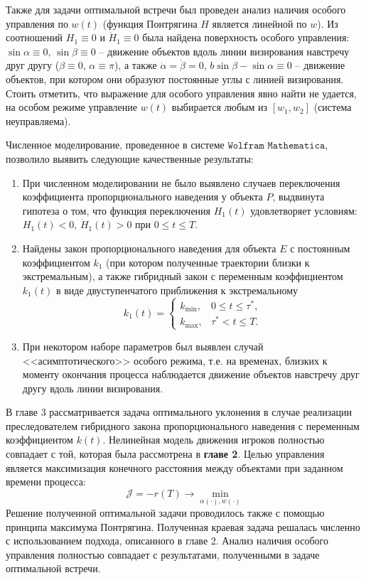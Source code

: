 \documentclass[a4paper,12pt, openany]{book}
\theoremstyle{plain} %
\theoremstyle{definition} %
\theoremstyle{remark} %
\numberwithin{equation}{chapter}
\begin{document}
{Также для задачи оптимальной встречи был проведен анализ наличия особого управления по $w(t)$ (функция Понтрягина $H$ является линейной по $w$). Из соотношений $H_1 \equiv 0$ и $\dot H_1 \equiv 0$ была найдена поверхность особого управления: $\sin\alpha \equiv 0$, $\sin\beta \equiv 0$ -- движение объектов вдоль линии визирования навстречу друг другу ($\beta \equiv 0$, $\alpha \equiv \pi$),  а также $\dot\alpha = \dot\beta = 0$, $b\sin\beta - \sin\alpha \equiv 0$ -- движение объектов, при котором они образуют постоянные углы с линией визирования. Стоить отметить, что выражение для особого управления явно найти не удается, на особом режиме управление $w(t)$ выбирается любым из $[w_1,w_2]$ (система неуправляема).

Численное моделирование, проведенное в системе $\texttt{Wolfram Mathematica}$, позволило выявить следующие качественные результаты:

\begin{enumerate}
\item При численном моделировании не было выявлено случаев переключения коэффициента пропорционального наведения у объекта $P$, выдвинута гипотеза о том, что функция переключения $H_1(t)$ удовлетворяет условиям: $H_1(t) < 0$, $\dot H_1(t) > 0$ при $0\leqslant t \leqslant T$.
\item Найдены закон пропорционального наведения для объекта $E$ с постоянным коэффициентом $k_1$ (при котором полученные траектории близки к экстремальным), а также гибридный закон с переменным коэффициентом $k_1(t)$ в виде двуступенчатого приближения к экстремальному
$$k_1 \left( t \right) = 
\begin{cases}
   k_{\min } , & 0 \leqslant t \leqslant \tau^* ,  \\
   k_{\max } ,& \tau^*  < t \leqslant T. 
\end{cases}
$$ 
\item При некотором наборе параметров был выявлен случай  <<асимптотического>> особого режима, т.е. на временах, близких к моменту окончания процесса наблюдается движение объектов навстречу друг другу вдоль линии визирования. 
\end{enumerate}

В главе 3 рассматривается задача оптимального уклонения в случае реализации преследователем гибридного закона пропорционального наведения с переменным коэффициентом $k(t)$. Нелинейная модель движения игроков полностью совпадает с той, которая была рассмотрена в \textbf{главе 2}. Целью управления является максимизация конечного расстояния между объектами при заданном времени процесса: 
$$
\mathcal{J} = -r(T) \longrightarrow \mathop {\min }\limits_{\alpha(\cdot),w(\cdot)} 
$$
Решение полученной оптимальной задачи проводилось также с помощью принципа максимума Понтрягина. Полученная краевая задача решалась численно с использованием подхода, описанного 
в главе 2. Анализ наличия особого управления полностью совпадает с результатами, полученными в задаче оптимальной встречи. 

}
\end{document}
